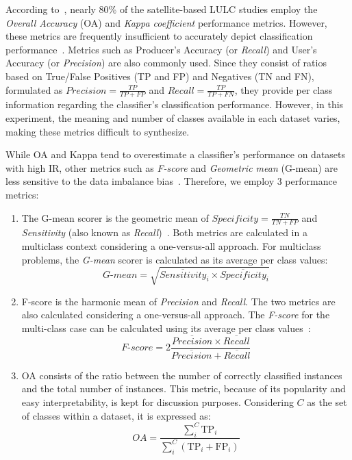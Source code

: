 \documentclass[preprint,12pt]{elsarticle}
\begin{document}
According to~\cite{Gavade2019}, nearly 80\% of the satellite-based LULC studies
employ the \textit{Overall Accuracy} (OA) and \textit{Kappa coefficient}
performance metrics. However, these metrics are frequently insufficient to
accurately depict classification performance~\cite{Olofsson2013, Pontius2011}.
Metrics such as Producer's Accuracy (or \textit{Recall}) and User's Accuracy
(or \textit{Precision}) are also commonly used. Since they consist of ratios
based on True/False Positives (TP and FP) and Negatives (TN and FN), formulated
as $Precision = \frac{TP}{TP+FP}$ and $Recall = \frac{TP}{TP+FN}$, they provide
per class information regarding the classifier's classification performance.
However, in this experiment, the meaning and number of classes available in
each dataset varies, making these metrics difficult to synthesize.

While OA and Kappa tend to overestimate a classifier's performance on datasets
with high IR, other metrics such as \textit{F-score} and \textit{Geometric
mean} (G-mean) are less sensitive to the data imbalance bias~\cite{Jeni2013,
Kubat1997}. Therefore, we employ 3 performance metrics:

\begin{enumerate}
    \item The G-mean scorer is the geometric mean of $Specificity =
        \frac{TN}{TN + FP}$ and \textit{Sensitivity} (also known as
        \textit{Recall})~\cite{Kubat1997}. Both metrics are calculated in a
        multiclass context considering a one-versus-all approach. For
        multiclass problems, the \textit{G-mean} scorer is calculated as its
        average per class values: 
        \begin{equation}\label{eq:gmean}
            \textit{G-mean} = \sqrt{\overline{Sensitivity}_i \times
            \overline{Specificity}_i}
        \end{equation}
    
    \item F-score is the harmonic mean of \textit{Precision} and
        \textit{Recall}. The two metrics are also calculated considering a
        one-versus-all approach. The \textit{F-score} for the multi-class case
        can be calculated using its average per class values~\cite{He2009}:
        \begin{equation}\label{eq:fscore}
            \textit{F-score}=2\frac{\overline{Precision} \times
            \overline{Recall}}{\overline{Precision} + \overline{Recall}}
        \end{equation}

    \item OA consists of the ratio between the number of correctly classified
        instances and the total number of instances. This metric, because
        of its popularity and easy interpretability, is kept for discussion
        purposes.  Considering $C$ as the set of classes within a dataset, it
        is expressed as: \begin{equation}\label{eq:oa} \textit{OA} =
        \frac{\sum_{i}^{C}{\text{TP}_{i}}}{\sum_{i}^{C}{(\text{TP}_{i} +
    \text{FP}_{i})}} \end{equation}

\end{enumerate}
\end{document}
